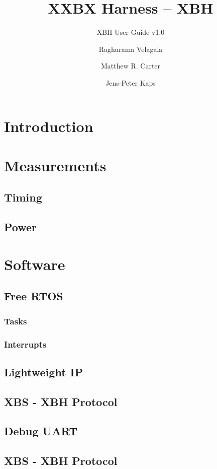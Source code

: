 \documentclass[twoside,11pt]{cergdoc}
\begin{document}
\title{XXBX Harness -- XBH}
\subtitle{XBH User Guide v1.0}
\author{Raghurama Velagala \and Matthew R. Carter \and Jens-Peter Kaps}

\maketitle

\tableofcontents

\chapter{Introduction}
\chapter{Measurements}
  \section{Timing}
  \section{Power}
\chapter{Software}
  \section{Free RTOS}
    \subsection{Tasks}
    \subsection{Interrupts}
  \section{Lightweight IP}
  \section{XBS - XBH Protocol}
  \section{Debug UART}

\begin{appendix}
\chapter{XBS - XBH Protocol}
\end{appendix}
\end{document}

